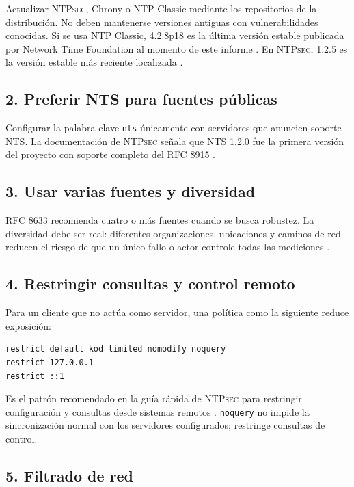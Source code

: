 \documentclass[11pt,a4paper]{article}
\newcommand{\ntpsec}{\textsc{NTPsec}}
\begin{document}
Actualizar \ntpsec{}, Chrony o NTP Classic mediante los repositorios de la distribución. No deben mantenerse versiones antiguas con vulnerabilidades conocidas. Si se usa NTP Classic, 4.2.8p18 es la última versión estable publicada por Network Time Foundation al momento de este informe \cite{ntpclassic}. En \ntpsec{}, 1.2.5 es la versión estable más reciente localizada \cite{ntpsec125}.

\subsection{2. Preferir NTS para fuentes públicas}

Configurar la palabra clave \texttt{nts} únicamente con servidores que anuncien soporte NTS. La documentación de \ntpsec{} señala que NTS 1.2.0 fue la primera versión del proyecto con soporte completo del RFC 8915 \cite{ntpsecnts}.

\subsection{3. Usar varias fuentes y diversidad}

RFC 8633 recomienda cuatro o más fuentes cuando se busca robustez. La diversidad debe ser real: diferentes organizaciones, ubicaciones y caminos de red reducen el riesgo de que un único fallo o actor controle todas las mediciones \cite{rfc8633}.

\subsection{4. Restringir consultas y control remoto}

Para un cliente que no actúa como servidor, una política como la siguiente reduce exposición:

\begin{lstlisting}[style=terminal]
restrict default kod limited nomodify noquery
restrict 127.0.0.1
restrict ::1
\end{lstlisting}

Es el patrón recomendado en la guía rápida de \ntpsec{} para restringir configuración y consultas desde sistemas remotos \cite{ntpsecquick}. \texttt{noquery} no impide la sincronización normal con los servidores configurados; restringe consultas de control.

\subsection{5. Filtrado de red}
\end{document}
